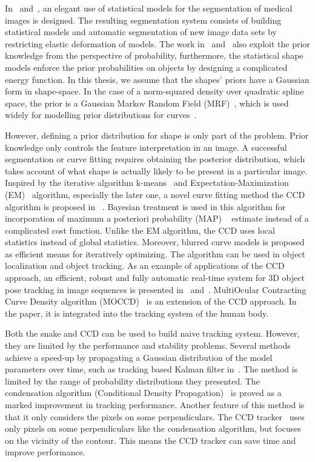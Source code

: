 In~\cite{kelemen1999three} and~\cite{kelemen1999elastic}, an elegant
use of statistical models for the segmentation of medical images is
designed.  The resulting segmentation system consists of building
statistical models and automatic segmentation of new image data
sets by restricting elastic deformation of models.  The work
in~\cite{sclaroff2001deformable} and~\cite{liu1999deformable} also
exploit the prior knowledge from the perspective of probability,
furthermore, the statistical shape models enforce the prior
probabilities on objects by designing a complicated energy function.  In this thesis, we assume that the shapes' priors have a Gaussian form in
shape-space. In the case of a norm-squared density over  quadratic spline space,
the prior is a Gaussian Markov Random Field (MRF)~\cite{blake1998active}, which is used widely  for modelling prior
distributions for curves~\cite{storvik1994bayesian}.


However, defining a prior distribution for shape is only part of the
problem. Prior knowledge only controls the feature interpretation in an
image. A successful segmentation or curve fitting requires
obtaining the posterior distribution, which takes account of what
shape is actually likely to be present in a particular image. Inspired
by the iterative algorithm k-means~\cite{ding2004k} and
Expectation-Maximization (EM)~\cite{dempster1977maximum} algorithm, especially the later one, a novel
curve fitting method the CCD algorithm is proposed in
~\cite{hanek2004contracting}. Bayesian treatment is used in this
algorithm for incorporation of maximum a posteriori probability (MAP)
~\cite{sorenson1980parameter} estimate instead of a complicated cost
function. Unlike the EM algorithm, the CCD uses local statistics
instead of global statistics. Moreover, blurred curve models is
proposed as efficient means for iteratively optimizing. The algorithm
can be used in object localization and object tracking. As an example
of applications of the CCD approach, an efficient, robust and fully
automatic real-time system for 3D object pose tracking in
image sequences is presented in~\cite{panin2006fully} and~\cite{panin2006efficient}. MultiOcular Contracting Curve Density
algorithm (MOCCD)~\cite{hahn2007tracking} is an extension of the CCD
approach. In the paper, it is integrated into the tracking system of the human body. 

Both the snake and CCD can be used to build naive tracking
system. However, they are limited by the performance and stability
problems. Several methods achieve a speed-up by propagating a Gaussian
distribution of the model parameters over time, such as tracking based
Kalman filter in~\cite{brookner1998tracking}. The method is limited by the range of probability
distributions they presented. The condensation algorithm (Conditional
Density Propagation)~\cite{isard1998icondensation} is proved as a marked improvement in tracking performance. Another feature of
this method is that it only considers the pixels on some
perpendiculars. The CCD tracker~\cite{hanek2004fitting} uses only
pixels on some perpendiculars like the condensation algorithm, but
focuses on the vicinity of the contour. This means the CCD tracker can
save time and improve performance.

